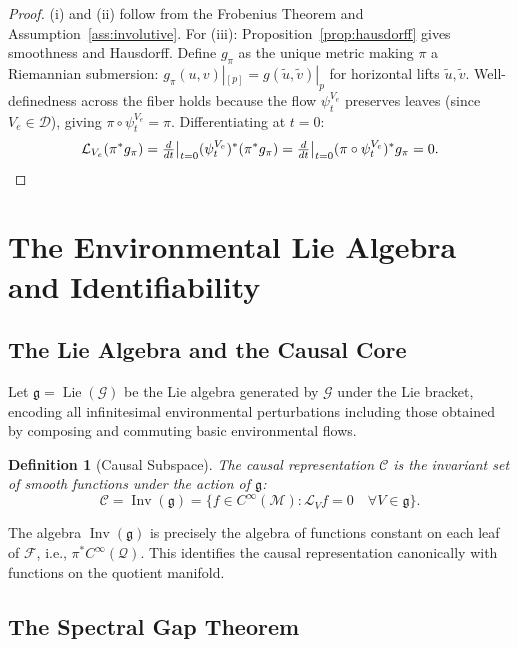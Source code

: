 \documentclass[11pt,a4paper]{article}
\newtheorem{definition}[theorem]{Definition}
\DeclareMathOperator{\Inv}{Inv}
\DeclareMathOperator{\Lie}{Lie}
\newcommand{\g}{\mathfrak{g}}
\newcommand{\cC}{\mathcal{C}}
\newcommand{\cM}{\mathcal{M}}
\newcommand{\cF}{\mathcal{F}}
\newcommand{\cG}{\mathcal{G}}
\newcommand{\cD}{\mathcal{D}}
\newcommand{\cQ}{\mathcal{Q}}
\newcommand{\LP}{\mathcal{L}}
\begin{document}
\begin{proof}
(i) and (ii) follow from the Frobenius Theorem and Assumption~\ref{ass:involutive}. For (iii): Proposition~\ref{prop:hausdorff} gives smoothness and Hausdorff. Define $g_\pi$ as the unique metric making $\pi$ a Riemannian submersion: $g_\pi(u, v)|_{[p]} = g(\tilde{u}, \tilde{v})|_p$ for horizontal lifts $\tilde{u}, \tilde{v}$. Well-definedness across the fiber holds because the flow $\psi_t^{V_e}$ preserves leaves (since $V_e \in \cD$), giving $\pi \circ \psi_t^{V_e} = \pi$. Differentiating at $t = 0$:
\[
\LP_{V_e}(\pi^* g_\pi) = \tfrac{d}{dt}\big|_{t=0}(\psi_t^{V_e})^*(\pi^* g_\pi) = \tfrac{d}{dt}\big|_{t=0}(\pi\circ\psi_t^{V_e})^* g_\pi = 0. \qedhere
\]
\end{proof}

\section{The Environmental Lie Algebra and Identifiability}
\label{sec:lie}

\subsection{The Lie Algebra and the Causal Core}

Let $\g = \Lie(\cG)$ be the Lie algebra generated by $\cG$ under the Lie bracket, encoding all infinitesimal environmental perturbations including those obtained by composing and commuting basic environmental flows.

\begin{definition}[Causal Subspace]\label{def:causal}
The causal representation $\cC$ is the invariant set of smooth functions under the action of $\g$:
\[
\cC = \Inv(\g) = \{f \in C^\infty(\cM) : \LP_V f = 0 \quad \forall V \in \g\}.
\]
\end{definition}

The algebra $\Inv(\g)$ is precisely the algebra of functions constant on each leaf of $\cF$, i.e., $\pi^* C^\infty(\cQ)$. This identifies the causal representation canonically with functions on the quotient manifold.

\subsection{The Spectral Gap Theorem}
\end{document}
